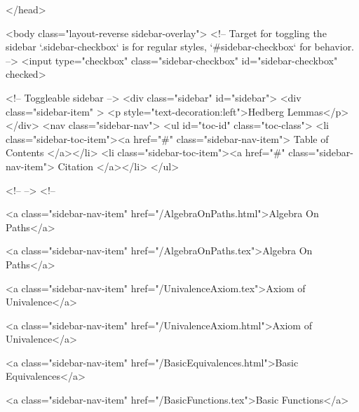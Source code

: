   
</head>




  <body class="layout-reverse sidebar-overlay">
    <!-- Target for toggling the sidebar `.sidebar-checkbox` is for regular
     styles, `#sidebar-checkbox` for behavior. -->
<input type="checkbox" class="sidebar-checkbox" id="sidebar-checkbox" checked>

<!-- Toggleable sidebar -->
<div class="sidebar" id="sidebar">
  <div class="sidebar-item" >
    <p style="text-decoration:left">Hedberg Lemmas</p>
  </div>
  <nav class="sidebar-nav">
    <ul id="toc-id" class="toc-class">
  <li class="sidebar-toc-item"><a href="#" class="sidebar-nav-item"> Table of Contents </a></li>
  <li class="sidebar-toc-item"><a href="#" class="sidebar-nav-item"> Citation </a></li>
</ul>


    <!--  -->
    <!-- 
      
    
      
    
      
    
      
    
      
        
      
    
      
        
          <a class="sidebar-nav-item" href="/AlgebraOnPaths.html">Algebra On Paths</a>
        
      
    
      
        
          <a class="sidebar-nav-item" href="/AlgebraOnPaths.tex">Algebra On Paths</a>
        
      
    
      
        
          <a class="sidebar-nav-item" href="/UnivalenceAxiom.tex">Axiom of Univalence</a>
        
      
    
      
        
          <a class="sidebar-nav-item" href="/UnivalenceAxiom.html">Axiom of Univalence</a>
        
      
    
      
        
          <a class="sidebar-nav-item" href="/BasicEquivalences.html">Basic Equivalences</a>
        
      
    
      
        
          <a class="sidebar-nav-item" href="/BasicFunctions.tex">Basic Functions</a>
        
